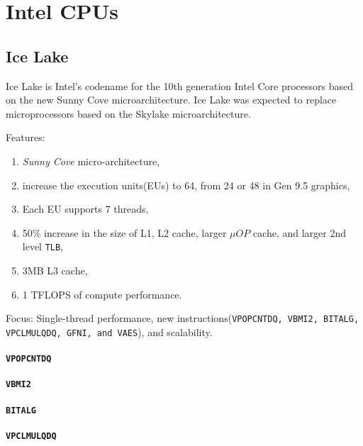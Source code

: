 \documentclass[10pt,conference]{IEEEtran}
\begin{document}
\newcommand{\todo}[1]{\color{red}\textbf{\hl{#1}}\color{black}\xspace}
\newcommand{\rom}[1]{\expandafter{\romannumeral #1\relax}}

\section{Intel CPUs}

\subsection{Ice Lake}
Ice Lake is Intel's codename for the 10th generation Intel Core processors based on the new Sunny Cove microarchitecture. 
Ice Lake was expected to replace microprocessors based on the Skylake microarchitecture.


Features:
\begin{enumerate}
\item \textit{Sunny Cove} micro-architecture,
\item increase the execution units(EUs) to 64, from 24 or 48 in Gen 9.5 graphics,
\item Each EU supports 7 threads,
\item 50\% increase in the size of L1, L2 cache, larger $\mu OP$ cache, and larger 2nd level \texttt{TLB},
\item 3MB L3 cache,
\item 1 TFLOPS of compute performance.
\end{enumerate}


Focus:
Single-thread performance, new instructions(\texttt{VPOPCNTDQ, VBMI2, BITALG, VPCLMULQDQ, GFNI, and VAES}), and scalability.

\paragraph{\texttt{VPOPCNTDQ}}

\paragraph{\texttt{VBMI2}}

\paragraph{\texttt{BITALG}}

\paragraph{\texttt{VPCLMULQDQ}}
\end{document}
